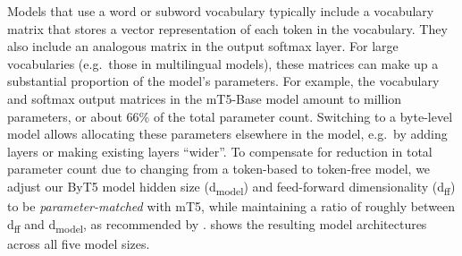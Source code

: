 \documentclass[11pt,a4paper]{article}
\begin{document}
\begin{table}[t!]
\hspace{-8pt}
\centering
{}
\caption{Comparison of mT5 and ByT5 architectures. For a given named size (e.g.~``Large''), the total numbers of parameters and layers are fixed. ``Vocab'' shows the percentage of vocabulary-related parameters, counting both the input embedding matrix and the decoder softmax layer. ByT5 moves these parameters out of the vocabulary and into the transformer layers, as well as shifting to a : ratio of encoder to decoder layers.}
\label{tab:model_params}
\end{table} 
Models that use a word or subword vocabulary typically include a vocabulary matrix that stores a vector representation of each token in the vocabulary.
They also include an analogous matrix in the output softmax layer.
For large vocabularies (e.g.\ those in multilingual models), these matrices can make up a substantial proportion of the model's parameters.
For example, the vocabulary and softmax output matrices in the \mbox{mT5-Base} model amount to  million parameters, or about 66\% of the total parameter count.
Switching to a byte-level model allows allocating these parameters elsewhere in the model, e.g.\ by adding layers or making existing layers ``wider''.
To compensate for reduction in total parameter count due to changing from a token-based to token-free model, we adjust our ByT5 model hidden size (d\textsubscript{model}) and feed-forward dimensionality (d\textsubscript{ff}) to be \textit{parameter-matched} with mT5, while maintaining a ratio of roughly  between d\textsubscript{ff} and d\textsubscript{model}, as recommended by \citet{kaplan2020scaling}.
 shows the resulting model architectures across all five model sizes.
\end{document}
